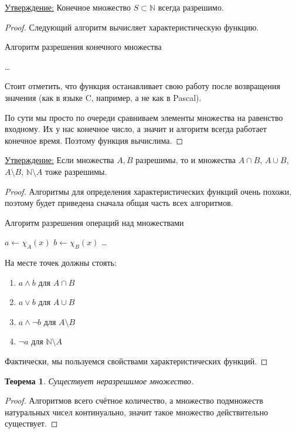 \documentclass[a4paper, 12pt]{article}
\newtheorem*{theorem}{Теорема}
\newcommand{\statement}{\underline{Утверждение:} }
\newcommand{\N}{\mathbb{N}}
\begin{document}
\statement{Конечное множество $S \subset \N$ всегда разрешимо.}
\begin{proof}
Следующий алгоритм вычисляет характеристическую функцию.

\begin{algorithm}
\caption{Алгоритм разрешения конечного множества}
\begin{algorithmic}[1]
        \State {}
    \EndIf
    \State \ldots
        \State {}
    \EndIf
    \State {}
\EndFunction
\end{algorithmic}
\end{algorithm}
Стоит отметить, что функция останавливает свою работу после
возвращения значения (как в языке C, например, а не как в Pascal).

По сути мы просто по очереди сравниваем элементы множества
на равенство входному. Их у нас конечное число, а значит и
алгоритм всегда работает конечное время. Поэтому функция вычислима.
\end{proof}

\statement{Если множества $A, B$ разрешимы, то и множества 
$A \cap B$, $A \cup B$, $A \setminus B$, $\N \setminus A$
тоже разрешимы.}
\begin{proof}
Алгоритмы для определения характеристических функций
очень похожи, поэтому будет приведена сначала общая часть
всех алгоритмов.
\begin{algorithm}
\caption{Алгоритм разрешения операций над множествами}
\begin{algorithmic}[1]
    \State $a \gets \chi_A(x)$
    \State $b \gets \chi_B(x)$
    \State \Return \ldots
\EndFunction
\end{algorithmic}
\end{algorithm}
На месте точек должны стоять:
\begin{enumerate}
    \item $a \land b$ для $A \cap B$
    \item $a \lor b$ для $A \cup B$
    \item $a \land \lnot b$ для $A \setminus B$
    \item $\lnot a$ для $\N \setminus A$
\end{enumerate}
Фактически, мы пользуемся свойствами характеристических функций.
\end{proof}

\begin{theorem}
Существует неразрешимое множество.
\end{theorem}
\begin{proof}
    Алгоритмов всего счётное количество, а множество подмножеств
    натуральных чисел континуально, значит такое множество
    действительно существует.
\end{proof}
\end{document}
